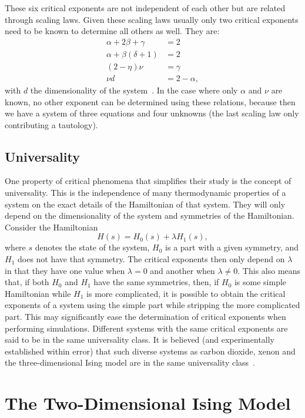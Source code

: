 \documentclass[11pt, a4paper]{report} %
\begin{document}
These six critical exponents are not independent of each other but are related through scaling laws.
Given these scaling laws usually only two critical exponents need to be known to determine all others as well.
They are:
\begin{align}
	\alpha + 2\beta +\gamma &= 2\\
	\alpha + \beta(\delta+1) &= 2\\
	(2-\eta)\nu &= \gamma \\
	\nu d &= 2- \alpha,
\end{align}
with \(d\) the dimensionality of the system~\cite{binney:1992,baxter:1989,landau:2015}.
In the case where only \(\alpha\) and \(\nu\) are known, no other exponent can be determined using these relations, because then we have a system of three equations and four unknowns (the last scaling law only contributing a tautology).


\subsection{Universality}
One property of critical phenomena that simplifies their study is the concept of universality.
This is the independence of many thermodynamic properties of a system on the exact details of the Hamiltonian of that system.
They will only depend on the dimensionality of the system and symmetries of the Hamiltonian.
Consider the Hamiltonian
\begin{equation}
	H(s) = H_0(s) + \lambda H_1(s),
\end{equation}
where \(s\) denotes the state of the system, \(H_0\) is a part with a given symmetry, and \(H_1\) does not have that symmetry.
The critical exponents then only depend on \(\lambda\) in that they have one value when \(\lambda=0\) and another when \(\lambda \neq 0\).
This also means that, if both \(H_0\) and \(H_1\) have the same symmetries, then, if \(H_0\) is some simple Hamiltonian while \(H_1\) is more complicated, it is possible to obtain the critical exponents of a system using the simple part while stripping the more complicated part.
This may significantly ease the determination of critical exponents when performing simulations.
Different systems with the same critical exponents are said to be in the same universality class.
It is believed (and experimentally established within error) that such diverse systems as carbon dioxide, xenon and the three-dimensional Ising model are in the same universality class~\cite{baxter:1989}.

\section{The Two-Dimensional Ising Model}\label{sec:ising_model}
\end{document}
